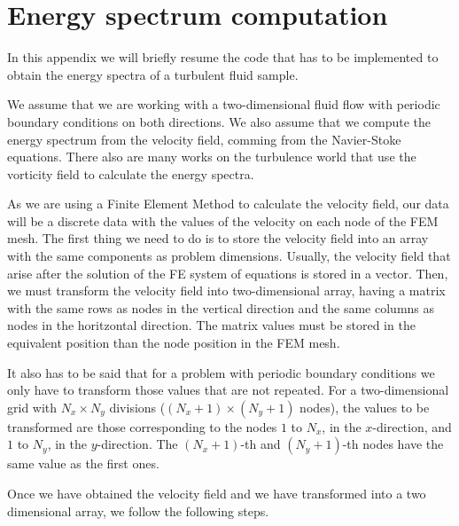 
\chapter{Energy spectrum computation} %
\label{appendix-spectrum_implementation}

\label{apenA-energy_spectrum_implementation} %

In this appendix we will briefly resume the code that has to be implemented to obtain the energy spectra of a turbulent fluid sample.

We assume that we are working with a two-dimensional fluid flow with periodic boundary conditions on both directions. We also assume that we compute the energy spectrum from the velocity field, comming from the Navier-Stoke equations. There also are many works on the turbulence world that use the vorticity field to calculate the energy spectra.

As we are using a Finite Element Method to calculate the velocity field, our data will be a discrete data with the values of the velocity on each node of the FEM mesh. The first thing we need to do is to store the velocity field into an array with the same components as problem dimensions. Usually, the velocity field that arise after the solution of the FE system of equations is stored in a vector. Then, we must transform the velocity field into two-dimensional array, having a matrix with the same rows as nodes in the vertical direction and the same columns as nodes in the horitzontal direction. The matrix values must be stored in the equivalent position than the node position in the FEM mesh.

It also has to be said that for a problem with periodic boundary conditions we only have to transform those values that are not repeated. For a two-dimensional grid with $N_x\times N_y$ divisions ($(N_x+1)\times(N_y+1)$ nodes), the values to be transformed are those corresponding to the nodes $1$ to $N_x$, in the $x$-direction, and $1$ to $N_y$, in the $y$-direction. The $(N_x+1)$-th and $(N_y+1)$-th nodes have the same value as the first ones.

Once we have obtained the velocity field and we have transformed into a two dimensional array, we follow the following steps.

